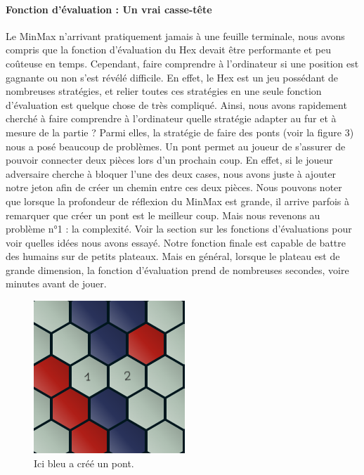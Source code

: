 \paragraph{Fonction d'évaluation : Un vrai casse-tête}Le MinMax n'arrivant pratiquement jamais à une feuille terminale, nous avons compris que la fonction
d'évaluation du Hex devait être performante et peu coûteuse en temps. Cependant, faire comprendre à l'ordinateur si une position est gagnante
ou non s'est révélé difficile. En effet, le Hex est un jeu possédant de nombreuses stratégies, et relier toutes ces stratégies en une
seule fonction d'évaluation est quelque chose de très compliqué. Ainsi, nous avons rapidement cherché à faire comprendre à l'ordinateur
quelle stratégie adapter au fur et à mesure de la partie ? Parmi elles, la stratégie de faire des ponts (voir la figure 3) nous a posé beaucoup de problèmes.
Un pont permet au joueur de s'assurer de pouvoir connecter deux pièces lors d'un prochain coup. En effet, si le joueur adversaire cherche à bloquer
l'une des deux cases, nous avons juste à ajouter notre jeton afin de créer un chemin entre ces deux pièces. Nous pouvons noter que lorsque la profondeur de
réflexion du MinMax est grande, il arrive parfois à remarquer que créer un pont est le meilleur coup. Mais nous revenons au problème n°1 : la complexité.
Voir la section sur les fonctions d'évaluations pour voir quelles idées nous avons essayé. Notre fonction finale est capable de battre des humains sur de petits 
plateaux. Mais en général, lorsque le plateau est de grande dimension, la fonction d'évaluation prend de nombreuses secondes, voire minutes avant de jouer.

\begin{figure}[h]
    \begin{center}
        \includegraphics[scale=0.5]{root/pont.png}
    \end{center}
    \caption[1]{Ici bleu a créé un pont\footnotemark.}\label{fig:pont_bleu}
\end{figure}

